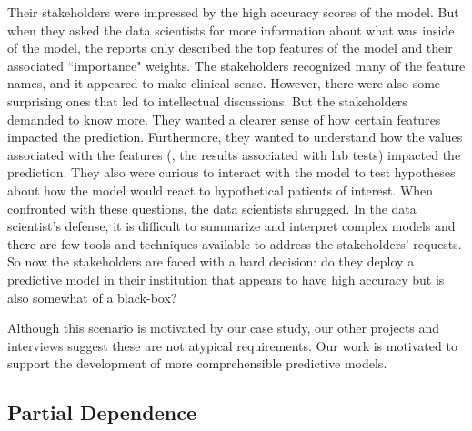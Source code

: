 Their stakeholders were impressed by the high accuracy scores of the model.  But when they asked the data scientists for more information about what was inside of the model, the reports only described the top features of the model and their associated ``importance" weights.  The stakeholders recognized many of the feature names, and it appeared to make clinical sense.  However, there were also some surprising ones that led to intellectual discussions.  But the stakeholders demanded to know more.  They wanted a clearer sense of how certain features impacted the prediction.  Furthermore, they wanted to understand how the values associated with the features (\eg, the results associated with lab tests) impacted the prediction.  They also were curious to interact with the model to test hypotheses about how the model would react to hypothetical patients of interest.  When confronted with these questions, the data scientists shrugged.  In the data scientist's defense, it is difficult to summarize and interpret complex models and there are few tools and techniques available to address the stakeholders' requests.  So now the stakeholders are faced with a hard decision:  do they deploy a predictive model in their institution that appears to have high accuracy but is also somewhat of a black-box?

Although this scenario is motivated by our case study, our other projects and interviews suggest these are not atypical requirements.  Our work is motivated to support the development of more comprehensible predictive models. 

\subsection{Partial Dependence}


